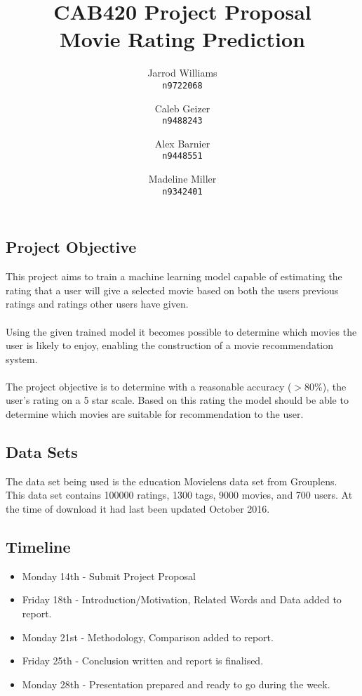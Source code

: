 \documentclass[]{report}   %
\begin{document}
\title{CAB420 Project Proposal \\ \large{Movie Rating Prediction}}   %
\author{
	Jarrod Williams\\
	\texttt{n9722068}
	\and 
	Caleb Geizer\\
	\texttt{n9488243}
	\and
	Alex Barnier\\
	\texttt{n9448551}
	\and	
	Madeline Miller\\
	\texttt{n9342401}
}
\maketitle

\subsection*{Project Objective}
This project aims to train a machine learning model capable of estimating the rating that a user will give a selected movie based on both the users previous ratings and ratings other users have given.
\\~\\
Using the given trained model it becomes possible to determine which movies the user is likely to enjoy, enabling the construction of a movie recommendation system.
\\~\\
The project objective is to determine with a reasonable accuracy ($>$80\%), the user's rating on a 5 star scale. Based on this rating the model should be able to determine which movies are suitable for recommendation to the user.
\subsection*{Data Sets}
The data set being used is the education Movielens data set from Grouplens. This data set contains 100000 ratings, 1300 tags, 9000 movies, and 700 users. At the time of download it had last been updated October 2016.

\subsection*{Timeline}
\begin{itemize}
  \item Monday 14th - Submit Project Proposal 
  \item Friday 18th - Introduction/Motivation, Related Words and Data added to report.
  \item Monday 21st - Methodology, Comparison added to report.
  \item Friday 25th - Conclusion written and report is finalised.
  \item Monday 28th - Presentation prepared and ready to go during the week.
\end{itemize}
\end{document}
